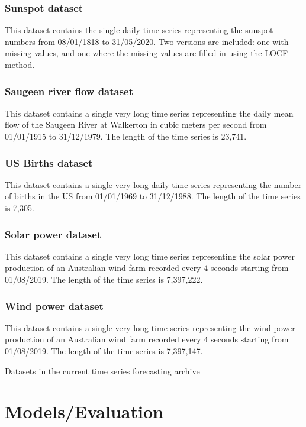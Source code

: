 \subsubsection{Sunspot dataset}
This dataset contains the single daily time series representing the sunspot numbers from 08/01/1818
to 31/05/2020. Two versions are included: one with missing values, and one where the missing values are filled in using the LOCF method.

\subsubsection{Saugeen river flow dataset}
This dataset contains a single very long time series representing the daily mean flow of the Saugeen
River at Walkerton in cubic meters per second from 01/01/1915 to 31/12/1979. The length of the time series is 23,741.

\subsubsection{US Births dataset}
This dataset contains a single very long daily time series representing the number of births in the US
from 01/01/1969 to 31/12/1988. The length of the time series is 7,305.

\subsubsection{Solar power dataset}
This dataset contains a single very long time series representing the solar power production of an
Australian wind farm recorded every 4 seconds starting from 01/08/2019. The length of the time
series is 7,397,222.

\subsubsection{Wind power dataset}
This dataset contains a single very long time series representing the wind power production of an
Australian wind farm recorded every 4 seconds starting from 01/08/2019. The length of the time
series is 7,397,147.

\begin{table}[H]
    \caption{Datasets in the current time series forecasting archive}
    \centering
    \resizebox{\textwidth}{!}{
    
    }
    \label{table:table1.tex}
\end{table}

\section{Models/Evaluation}

